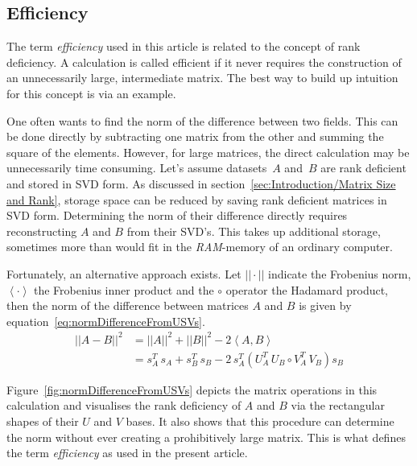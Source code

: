 \documentclass[ijgi,article,submit,moreauthors,pdftex,10pt,a4paper]{Definitions/mdpi}
\begin{document}
\subsection{Efficiency}
\label{sec:Introduction/Efficiency}

The term \textit{efficiency} used in this article is related to the concept of rank deficiency. A calculation is called efficient if it never requires the construction of an unnecessarily large, intermediate matrix. The best way to build up intuition for this concept is via an example.

One often wants to find the norm of the difference between two fields. This can be done directly by subtracting one matrix from the other and summing the square of the elements. However, for large matrices, the direct calculation may be unnecessarily time consuming. Let's assume datasets~$A$ and~$B$ are rank deficient and stored in SVD form. As discussed in section~\ref{sec:Introduction/Matrix Size and Rank}, storage space can be reduced by saving rank deficient matrices in SVD form. Determining the norm of their difference directly requires reconstructing $A$ and $B$ from their SVD's. This takes up additional storage, sometimes more than would fit in the \textit{RAM}-memory of an ordinary computer.

Fortunately, an alternative approach exists. Let $|| \cdot ||$ indicate the Frobenius norm, $\left\langle \cdot \right\rangle$ the Frobenius inner product and the $\circ$ operator the Hadamard product, then the norm of the difference between matrices $A$ and $B$ is given by equation~\ref{eq:normDifferenceFromUSVs}.
\begin{equation}
\label{eq:normDifferenceFromUSVs}
\begin{split}
||A-B||^{2} & = ||A||^{2} + ||B||^{2} - 2 \left\langle A, B \right\rangle \\
& = s_{A}^{T} \, s_{A} + s_{B}^{T} \, s_{B} - 2 \, s_{A}^{T} \left( U_{A}^{T} \, U_{B} \circ V_{A}^{T} \, V_{B} \right) s_{B}
\end{split}
\end{equation}

Figure~\ref{fig:normDifferenceFromUSVs} depicts the matrix operations in this calculation and visualises the rank deficiency of $A$ and $B$ via the rectangular shapes of their $U$ and $V$ bases. It also shows that this procedure can determine the norm without ever creating a prohibitively large matrix. This is what defines the term \textit{efficiency} as used in the present article.
\end{document}
